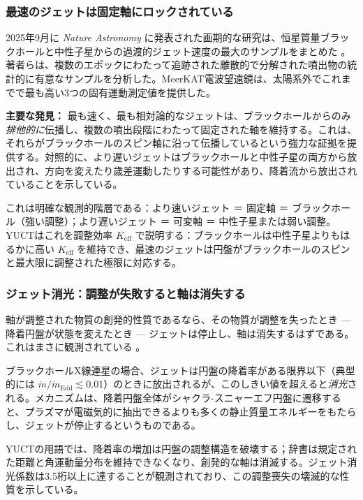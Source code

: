 \documentclass[12pt,a4paper]{article}
\begin{document}
	\subsubsection{最速のジェットは固定軸にロックされている}
	
	2025年9月に \emph{Nature Astronomy} に発表された画期的な研究は、恒星質量ブラックホールと中性子星からの過渡的ジェット速度の最大のサンプルをまとめた \cite{NatureAstronomy2025}。著者らは、複数のエポックにわたって追跡された離散的で分解された噴出物の統計的に有意なサンプルを分析した。MeerKAT電波望遠鏡は、太陽系外でこれまでで最も高い3つの固有運動測定値を提供した。
	
	\textbf{主要な発見：} 最も速く、最も相対論的なジェットは、ブラックホールからのみ\textit{排他的に}伝播し、複数の噴出段階にわたって固定された軸を維持する。これは、それらがブラックホールのスピン軸に沿って伝播しているという強力な証拠を提供する。対照的に、より遅いジェットはブラックホールと中性子星の両方から放出され、方向を変えたり歳差運動したりする可能性があり、降着流から放出されていることを示している。
	
	これは明確な観測的階層である：より速いジェット ＝ 固定軸 ＝ ブラックホール（強い調整）；より遅いジェット ＝ 可変軸 ＝ 中性子星または弱い調整。YUCTはこれを調整効率 \(K_{\mathrm{eff}}\) で説明する：ブラックホールは中性子星よりもはるかに高い \(K_{\mathrm{eff}}\) を維持でき、最速のジェットは円盤がブラックホールのスピンと最大限に調整された極限に対応する。
	
	\subsubsection{ジェット消光：調整が失敗すると軸は消失する}
	
	軸が調整された物質の創発的性質であるなら、その物質が調整を失ったとき — 降着円盤が状態を変えたとき — ジェットは停止し、軸は消失するはずである。これはまさに観測されている \cite{JetQuenching2006,JetQuenching2018}。
	
	ブラックホールX線連星の場合、ジェットは円盤の降着率がある限界以下（典型的には \(\dot{m}/\dot{m}_{\text{Edd}} \lesssim 0.01\)）のときに放出されるが、このしきい値を超えると\textit{消光}される。メカニズムは、降着円盤全体がシャクラ-スニャーエフ円盤に遷移すると、プラズマが電磁気的に抽出できるよりも多くの静止質量エネルギーをもたらし、ジェットが停止するというものである。
	
	YUCTの用語では、降着率の増加は円盤の調整構造を破壊する；辞書は規定された距離と角運動量分布を維持できなくなり、創発的な軸は消滅する。ジェット消光係数は3.5桁以上に達することが観測されており、この調整喪失の壊滅的な性質を示している。
	
\end{document}

